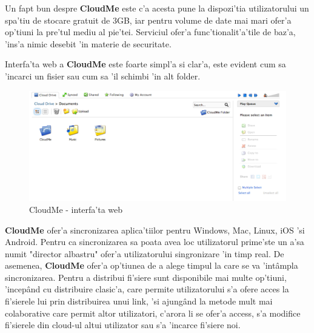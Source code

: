 \documentclass[12pt,a4paper,twoside]{report}
\begin{document}
Un fapt bun despre \textbf{CloudMe} este c'a acesta pune la dispozi'tia utilizatorului un spa'tiu de stocare gratuit de 3GB, iar pentru volume de date mai mari ofer'a op'tiuni la pre'tul mediu al pie'tei. Serviciul ofer'a func'tionalit'a'tile de baz'a, 'ins'a nimic desebit 'in materie de securitate. 

Interfa'ta web a \textbf{CloudMe} este foarte simpl'a si clar'a, este evident cum sa 'incarci un fisier sau cum sa 'il schimbi 'in alt folder.
\begin{figure}[H]
\begin{center}
\advance\leftskip-3cm
\advance\rightskip-3cm
\includegraphics[keepaspectratio=true,scale=0.35]{img/Web-interface_CloudME.png}
\caption{CloudMe - interfa'ta web}
\label{web_cloudMe}
\end{center}
\end{figure}

\textbf{CloudMe} ofer'a sincronizarea aplica'tiilor pentru Windows, Mac, Linux, iOS 'si Android. Pentru ca sincronizarea sa poata avea loc utilizatorul prime'ste un a'sa numit "director albastru" ofer'a utilizatorului singronizare 'in timp real. De asemenea, \textbf{CloudMe} ofer'a op'tiunea de a alege timpul la care se va 'intâmpla sincronizarea.
Pentru a distribui fi'siere sunt disponibile mai multe op'tiuni, 'incepând cu distribuire clasic'a, care permite utilizatorului s'a ofere acces la fi'sierele lui prin distribuirea unui link, 'si ajungând la metode mult mai colaborative care permit altor utilizatori, c'arora li se ofer'a access, s'a modifice fi'sierele din cloud-ul altui utilizator sau s'a 'incarce fi'siere noi.
\end{document}
